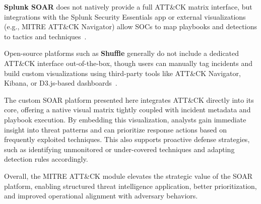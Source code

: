 \textbf{Splunk SOAR} does not natively provide a full ATT\&CK matrix interface, but integrations with the Splunk Security Essentials app or external visualizations (e.g., MITRE ATT\&CK Navigator) allow SOCs to map playbooks and detections to tactics and techniques~\cite{splunk}.

Open-source platforms such as \textbf{Shuffle} generally do not include a dedicated ATT\&CK interface out-of-the-box, though users can manually tag incidents and build custom visualizations using third-party tools like ATT\&CK Navigator, Kibana, or D3.js-based dashboards~\cite{techtarget}.

The custom SOAR platform presented here integrates ATT\&CK directly into its core, offering a native visual matrix tightly coupled with incident metadata and playbook execution. By embedding this visualization, analysts gain immediate insight into threat patterns and can prioritize response actions based on frequently exploited techniques. This also supports proactive defense strategies, such as identifying unmonitored or under-covered techniques and adapting detection rules accordingly.

Overall, the MITRE ATT\&CK module elevates the strategic value of the SOAR platform, enabling structured threat intelligence application, better prioritization, and improved operational alignment with adversary behaviors.